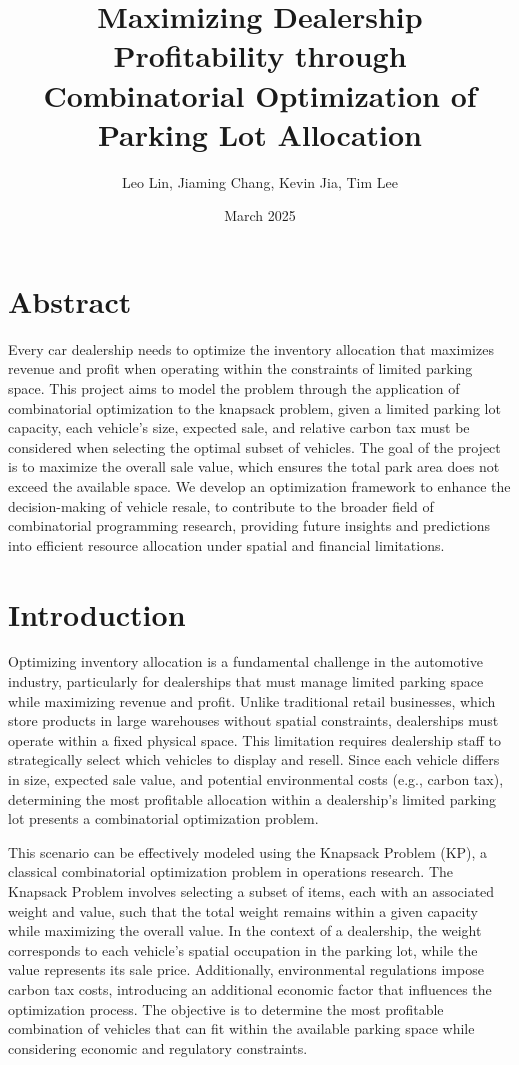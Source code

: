 \documentclass{article}
\title{Maximizing Dealership Profitability through Combinatorial Optimization of Parking Lot Allocation}
\author{Leo Lin, Jiaming Chang, Kevin Jia, Tim Lee}
\date{March 2025}
\begin{document}
    
\maketitle

\section{Abstract}

Every car dealership needs to optimize the inventory allocation that maximizes revenue and profit when operating within the constraints of limited parking space. This project aims to model the problem through the application of combinatorial optimization to the knapsack problem, given a limited parking lot capacity, each vehicle’s size, expected sale, and relative carbon tax must be considered when selecting the optimal subset of vehicles. The goal of the project is to maximize the overall sale value, which ensures the total park area does not exceed the available space. We develop an optimization framework to enhance the decision-making of vehicle resale, to contribute to the broader field of combinatorial programming research, providing future insights and predictions into efficient resource allocation under spatial and financial limitations.


\section{Introduction}

Optimizing inventory allocation is a fundamental challenge in the automotive industry, particularly for dealerships that must manage limited parking space while maximizing revenue and profit. Unlike traditional retail businesses, which store products in large warehouses without spatial constraints, dealerships must operate within a fixed physical space. This limitation requires dealership staff to strategically select which vehicles to display and resell. Since each vehicle differs in size, expected sale value, and potential environmental costs (e.g., carbon tax), determining the most profitable allocation within a dealership’s limited parking lot presents a combinatorial optimization problem.

This scenario can be effectively modeled using the Knapsack Problem (KP), a classical combinatorial optimization problem in operations research. The Knapsack Problem involves selecting a subset of items, each with an associated weight and value, such that the total weight remains within a given capacity while maximizing the overall value. In the context of a dealership, the weight corresponds to each vehicle’s spatial occupation in the parking lot, while the value represents its sale price. Additionally, environmental regulations impose carbon tax costs, introducing an additional economic factor that influences the optimization process. The objective is to determine the most profitable combination of vehicles that can fit within the available parking space while considering economic and regulatory constraints.
\end{document}

